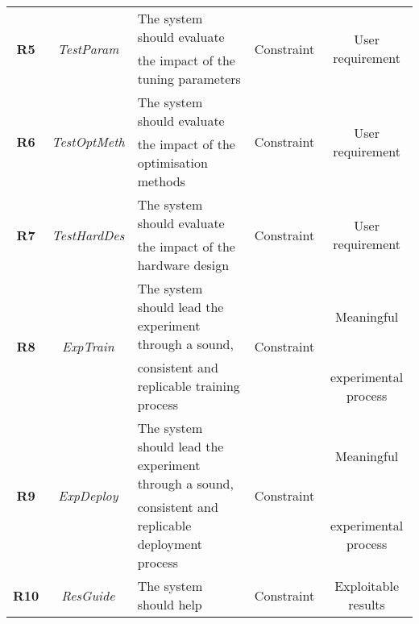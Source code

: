 {\begin{tabular}{| c c l c c |}
\multirow{2}{*}{\textbf{R5}}  & \multirow{2}{*}{\emph{TestParam}}       & The system should evaluate                                             & \multirow{2}{*}{Constraint} & \multirow{2}{*}{User requirement} \\
                              &                                         & the impact of the tuning parameters                                    &                             & \\ \hline
\multirow{2}{*}{\textbf{R6}}  & \multirow{2}{*}{\emph{TestOptMeth}}     & The system should evaluate                                             & \multirow{2}{*}{Constraint} & \multirow{2}{*}{User requirement} \\
                              &                                         & the impact of the optimisation methods                                 &                             & \\ \hline
\multirow{2}{*}{\textbf{R7}}  & \multirow{2}{*}{\emph{TestHardDes}}     & The system should evaluate                                             & \multirow{2}{*}{Constraint} & \multirow{2}{*}{User requirement} \\
                              &                                         & the impact of the hardware design                                      &                             & \\ \hline
\multirow{2}{*}{\textbf{R8}}  & \multirow{2}{*}{\emph{ExpTrain}}        & The system should lead the experiment through a sound,                 & \multirow{2}{*}{Constraint} & Meaningful \\ 
                              &                                         & consistent and replicable training process                             &                             & experimental process\\\hline
\multirow{2}{*}{\textbf{R9}}  & \multirow{2}{*}{\emph{ExpDeploy}}       & The system should lead the experiment through a sound,                 & \multirow{2}{*}{Constraint} & Meaningful \\ 
                              &                                         & consistent and replicable deployment process                           &                             & experimental process\\ \hline
\multirow{2}{*}{\textbf{R10}} & \multirow{2}{*}{\emph{ResGuide}}        & The system should help                                                 & \multirow{2}{*}{Constraint} & \multirow{2}{*}{Exploitable results}\\

\end{tabular}}

